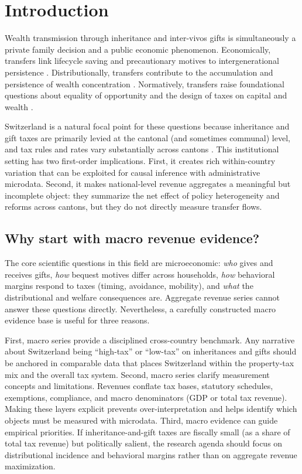 \documentclass[11pt,a4paper]{article}
\begin{document}
\section{Introduction}
Wealth transmission through inheritance and inter-vivos gifts is simultaneously a private family decision and a public economic phenomenon. Economically, transfers link lifecycle saving and precautionary motives to intergenerational persistence \parencite{Aiyagari1994,DeNardi2004,DeNardiYang2016}. Distributionally, transfers contribute to the accumulation and persistence of wealth concentration \parencite{Piketty2014,PikettyZucman2015,SaezZucman2016}. Normatively, transfers raise foundational questions about equality of opportunity and the design of taxes on capital and wealth \parencite{AtkinsonStiglitz1976,Mirrlees2011,PikettySaez2013}.

Switzerland is a natural focal point for these questions because inheritance and gift taxes are primarily levied at the cantonal (and sometimes communal) level, and tax rules and rates vary substantially across cantons \parencite{EFDJUSO2024}. This institutional setting has two first-order implications. First, it creates rich within-country variation that can be exploited for causal inference with administrative microdata. Second, it makes national-level revenue aggregates a meaningful but incomplete object: they summarize the net effect of policy heterogeneity and reforms across cantons, but they do not directly measure transfer flows.

\subsection{Why start with macro revenue evidence?}
The core scientific questions in this field are microeconomic: \emph{who} gives and receives gifts, \emph{how} bequest motives differ across households, \emph{how} behavioral margins respond to taxes (timing, avoidance, mobility), and \emph{what} the distributional and welfare consequences are. Aggregate revenue series cannot answer these questions directly. Nevertheless, a carefully constructed macro evidence base is useful for three reasons.

First, macro series provide a disciplined cross-country benchmark. Any narrative about Switzerland being ``high-tax'' or ``low-tax'' on inheritances and gifts should be anchored in comparable data that places Switzerland within the property-tax mix and the overall tax system. Second, macro series clarify measurement concepts and limitations. Revenues conflate tax bases, statutory schedules, exemptions, compliance, and macro denominators (GDP or total tax revenue). Making these layers explicit prevents over-interpretation and helps identify which objects must be measured with microdata. Third, macro evidence can guide empirical priorities. If inheritance-and-gift taxes are fiscally small (as a share of total tax revenue) but politically salient, the research agenda should focus on distributional incidence and behavioral margins rather than on aggregate revenue maximization.
\end{document}
